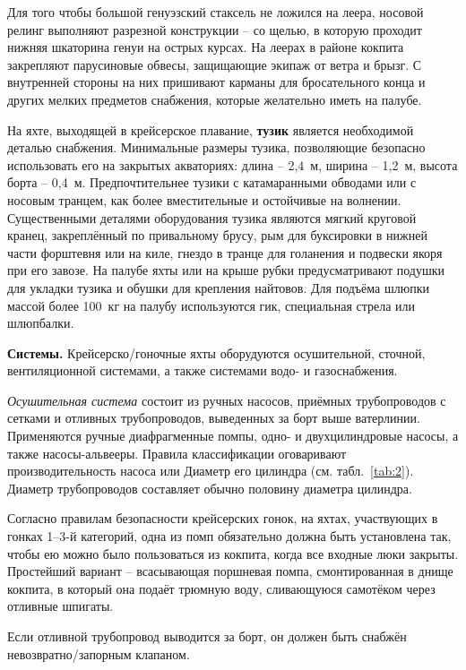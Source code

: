Для того чтобы большой генуэзский стаксель не ложился на леера,
носовой релинг выполняют разрезной конструкции \--- со щелью, в
которую проходит нижняя шкаторина генуи на острых курсах. На леерах в
районе кокпита закрепляют парусиновые обвесы, защищающие экипаж от
ветра и брызг. С внутренней стороны на них пришивают карманы для
бросательного конца и других мелких предметов снабжения, которые
желательно иметь на палубе.

На яхте, выходящей в крейсерское плавание, \textbf{тузик}
является необходимой деталью снабжения. Минимальные размеры тузика,
позволяющие безопасно использовать его на закрытых акваториях: длина
\--- 2,4~м, ширина \--- 1,2~м, высота борта \---
0,4~м. Предпочтительнее тузики с катамаранными обводами или с носовым
транцем, как более вместительные и остойчивые на
волнении. Существенными деталями оборудования тузика являются мягкий
круговой кранец, закреплённый по привальному брусу, рым для буксировки
в нижней части форштевня или на киле, гнездо в транце для голанения и
подвески якоря при его завозе. На палубе яхты или на крыше рубки
предусматривают подушки для укладки тузика и обушки для крепления
найтовов. Для подъёма шлюпки массой более 100~кг на палубу
используются гик, специальная стрела или шлюпбалки.

\textbf{Системы.} Крейсерско\-/гоночные яхты оборудуются осушительной,
сточной, вентиляционной системами, а также системами водо- и
газоснабжения.

\textit{Осушительная система} состоит из ручных
насосов, приёмных трубопроводов с сетками и отливных трубопроводов,
выведенных за борт выше ватерлинии. Применяются ручные диафрагменные
помпы, одно- и двухцилиндровые насосы, а также
насосы-альвееры. Правила классификации оговаривают производительность
насоса или Диаметр его цилиндра (см. табл.~\ref{tab:2}). Диаметр
трубопроводов составляет обычно половину диаметра цилиндра.

Согласно правилам безопасности крейсерских гонок, на яхтах,
участвующих в гонках 1--3-й категорий, одна из помп обязательно должна
быть установлена так, чтобы ею можно было пользоваться из кокпита,
когда все входные люки закрыты. Простейший вариант \--- всасывающая
поршневая помпа, смонтированная в днище кокпита, в который она подаёт
трюмную воду, сливающуюся самотёком через отливные шпигаты.

Если отливной трубопровод выводится за борт, он должен быть снабжён
невозвратно\-/запорным клапаном.


